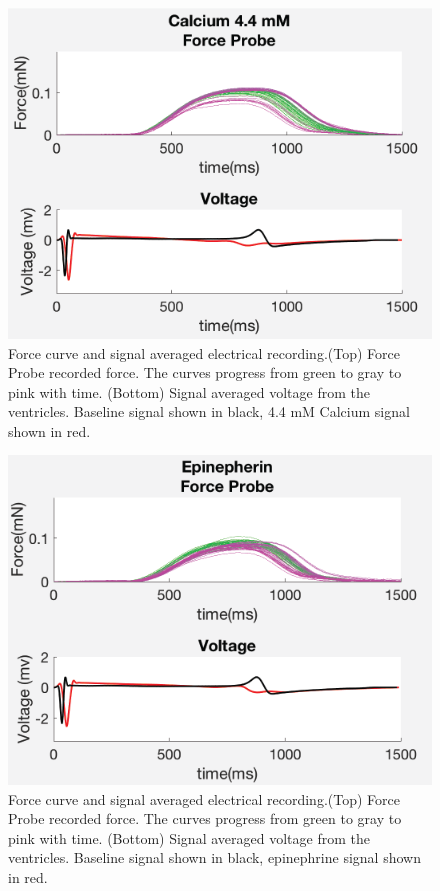\documentclass[12pt]{article}
\begin{document}
\begin{figure}[H]
	\label{fig:CalcHigh}
	\centering
	\includegraphics[width = .95\textwidth]{Figures/Calciumhigh.png}
	\caption{Force curve and signal averaged electrical recording.(Top) Force Probe recorded force. The curves progress from green to gray to pink with time. (Bottom) Signal averaged voltage from the ventricles. Baseline signal shown in black, 4.4 mM Calcium signal shown in red. }
\end{figure}
\begin{figure}[H]
	\label{fig:Epi}
	\centering
	\includegraphics[width = .95\textwidth]{Figures/Epi.png}
	\caption{Force curve and signal averaged electrical recording.(Top) Force Probe recorded force. The curves progress from green to gray to pink with time. (Bottom) Signal averaged voltage from the ventricles. Baseline signal shown in black, epinephrine  signal shown in red. }
\end{figure}
\end{document}
